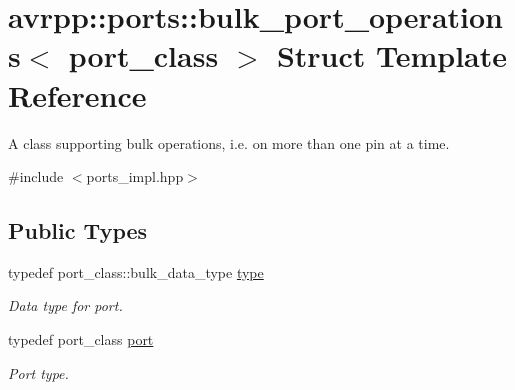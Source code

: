 \hypertarget{structavrpp_1_1ports_1_1bulk__port__operations}{
\section{avrpp::ports::bulk\_\-port\_\-operations$<$ port\_\-class $>$ Struct Template Reference}
\label{structavrpp_1_1ports_1_1bulk__port__operations}
}


A class supporting bulk operations, i.e. on more than one pin at a time.  




{\ttfamily \#include $<$ports\_\-impl.hpp$>$}

\subsection*{Public Types}
\begin{DoxyCompactItemize}
\item 
typedef port\_\-class::bulk\_\-data\_\-type \hyperlink{structavrpp_1_1ports_1_1bulk__port__operations_a2a673fecf314e62c4c7a88fc63911ebb}{type}
\begin{DoxyCompactList}\small\item\em Data type for port. \item\end{DoxyCompactList}\item 
typedef port\_\-class \hyperlink{structavrpp_1_1ports_1_1bulk__port__operations_a40b1eac998801ad35ea64ab07a1a4785}{port}
\begin{DoxyCompactList}\small\item\em Port type. \item\end{DoxyCompactList}\end{DoxyCompactItemize}
